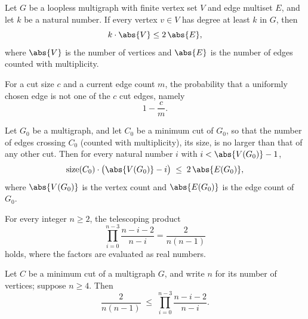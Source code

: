 \begin{lemma}
\label{edge_count_lower_bound}
\leanok
{}
Let $G$ be a loopless multigraph with finite vertex set $V$ and edge multiset $E$, and
let $k$ be a natural number. If every vertex $v \in V$ has degree at least $k$ in $G$,
then
\[
  k \cdot \abs{V} \le 2\,\abs{E},
\]
where $\abs{V}$ is the number of vertices and $\abs{E}$ is the number of edges counted
with multiplicity.
\end{lemma}

\begin{definition}
\label{survivalProb}
\leanok
For a cut size $c$ and a current edge count $m$, the probability that a uniformly chosen
edge is not one of the $c$ cut edges, namely
\[
  1 - \frac{c}{m}.
\]
\end{definition}

\begin{lemma}
\label{edge_count_invariant}
\leanok
{}
Let $G_0$ be a multigraph, and let $C_0$ be a minimum cut of $G_0$, so that the number
of edges crossing $C_0$ (counted with multiplicity), its size, is no larger than that of
any other cut. Then for every natural number $i$ with $i < \abs{V(G_0)} - 1$,
\[
  \mathrm{size}(C_0)\cdot\bigl(\abs{V(G_0)} - i\bigr) \;\le\; 2\,\abs{E(G_0)},
\]
where $\abs{V(G_0)}$ is the vertex count and $\abs{E(G_0)}$ is the edge count of $G_0$.
\end{lemma}

\begin{lemma}
\label{telescope_prod}
\leanok
{}
For every integer $n \ge 2$, the telescoping product
\[
  \prod_{i=0}^{n-3} \frac{n - i - 2}{n - i} = \frac{2}{n(n-1)}
\]
holds, where the factors are evaluated as real numbers.
\end{lemma}

\begin{theorem}
\label{karger_survival_prob_algorithmic}
\leanok
{}
Let $C$ be a minimum cut of a multigraph $G$, and write $n$ for its number of vertices;
suppose $n \ge 4$. Then
\[
  \frac{2}{n(n-1)} \;\le\; \prod_{i=0}^{n-3} \frac{n-i-2}{n-i}.
\]
\end{theorem}

